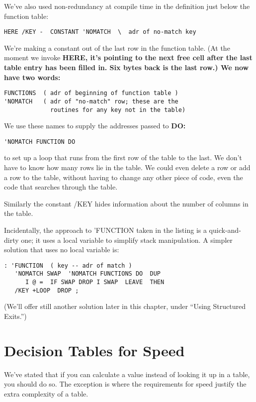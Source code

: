 We've also used non-redundancy at compile time in the definition just
below the function table:

\begin{verbatim}
HERE /KEY -  CONSTANT 'NOMATCH  \  adr of no-match key
\end{verbatim}

We're making a constant out of the last row in the function table. (At the
moment we invoke \bf{HERE}, it's pointing to the next free cell after the last
table entry has been filled in. Six bytes back is the last row.) We now have
two words:

\begin{verbatim}
FUNCTIONS  ( adr of beginning of function table )
'NOMATCH   ( adr of "no-match" row; these are the
             routines for any key not in the table)
\end{verbatim}

We use these names to supply the addresses passed to \bf{DO}:

\begin{verbatim}
'NOMATCH FUNCTION DO
\end{verbatim}

to set up a loop that runs from the first row of the table to the last. We
don't have to know how many rows lie in the table. We could even delete a
row or add a row to the table, without having to change any other piece of
code, even the code that searches through the table.

Similarly the constant /KEY hides information about the number of
columns in the table.

Incidentally, the approach to 'FUNCTION taken in the listing is a
quick-and-dirty one; it uses a local variable to simplify stack
manipulation. A simpler solution that uses no local variable is:

\begin{verbatim}
: 'FUNCTION  ( key -- adr of match )
   'NOMATCH SWAP  'NOMATCH FUNCTIONS DO  DUP
      I @ =  IF SWAP DROP I SWAP  LEAVE  THEN
   /KEY +LOOP  DROP ;
\end{verbatim}

(We'll offer still another solution later in this chapter, under ``Using
Structured Exits.'')

\section{Decision Tables for Speed}

We've stated that if you can calculate a value instead of looking it up in a
table, you should do so. The exception is where the requirements for
speed justify the extra complexity of a table.


